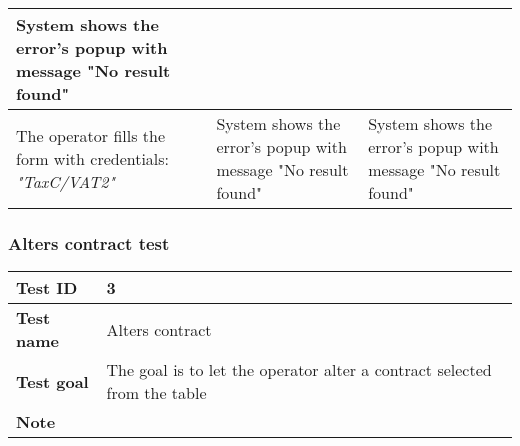 {{{\begin{table}[h]
\begin{tabular}{|p{4cm}|p{5cm}|p{5cm}|}
				\vspace{1mm} System shows the error's popup with message "No result found" \vspace{1mm} \\
			\hline
				\vspace{1mm} The operator fills the form with credentials: \itshape{"TaxC/VAT2"} \vspace{1mm} &
				\vspace{1mm} System shows the error's popup with message "No result found" \vspace{1mm} & 
				\vspace{1mm} System shows the error's popup with message "No result found" \vspace{1mm} \\
			\hline
			\end{tabular}
			\end{table}
		}
		\clearpage

		\subsubsection{Alters contract test}{
			\begin{table}[h]
			\begin{tabular}{|p{4cm}|p{10cm}|}
			\hline
				\centering \vspace{1mm} \bfseries{Test ID} \vspace{1mm} & 
				\vspace{1mm} 3 \vspace{1mm}\\
			\hline
				\centering \vspace{1mm} \bfseries{Test name} \vspace{1mm} & 
				\vspace{1mm} Alters contract\vspace{1mm}\\
			\hline
				\centering \vspace{1mm} \bfseries{Test goal} \vspace{1mm} & 
				\vspace{1mm} The goal is to let the operator alter a contract selected from the table\vspace{1mm}\\
			\hline
				\centering \vspace{1mm} \bfseries{Note} \vspace{1mm} & 
				\vspace{1mm}  \vspace{1mm}\\
			\hline
			\end{tabular}
			\end{table}

}}}
